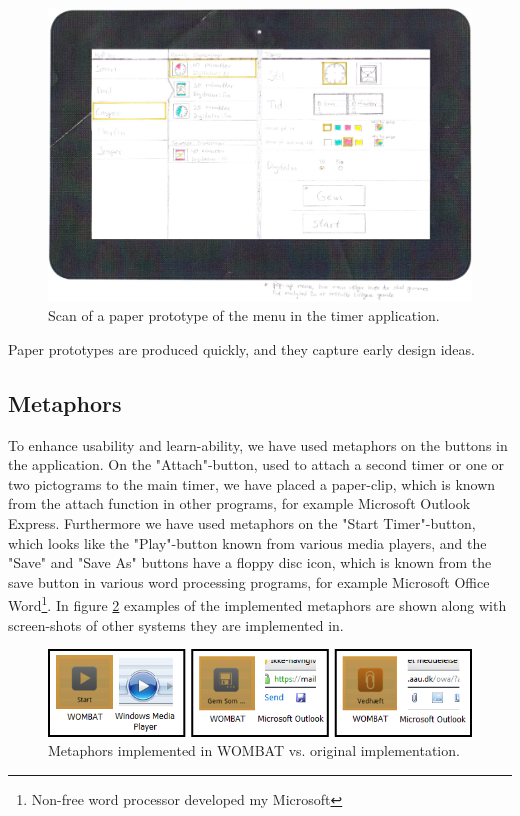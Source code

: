 	\begin{figure}[H]
		\centering
			\includegraphics[width=\textwidth]{Images/paper_prototype/menu.png}
				\caption{Scan of a paper prototype of the menu in the timer application.}
		\label{fig:pap_prot_menu}
	\end{figure}

Paper prototypes are produced quickly, and they capture early design ideas.

	\subsection{Metaphors}
	To enhance usability and learn-ability, we have used metaphors\cite{misc:designInterSys} on the buttons in the application. On the "Attach"-button, used to attach a second timer or one or two pictograms to the main timer, we have placed a paper-clip, which is known from the attach function in other programs, for example Microsoft Outlook Express. Furthermore we have used metaphors on the "Start Timer"-button, which looks like the "Play"-button known from various media players, and the "Save" and "Save As" buttons have a floppy disc icon, which is known from the save button in various word processing programs, for example Microsoft Office Word\footnote{Non-free word processor developed my Microsoft}. In figure \ref{fig:metaphors} examples of the implemented metaphors are shown along with screen-shots of other systems they are implemented in.

	\begin{figure}[H]
		\centering
			\includegraphics[width=\textwidth]{Images/Implementation/wombat_metaphors.png}
				\caption{Metaphors implemented in WOMBAT vs. original implementation.}
		\label{fig:metaphors}
	\end{figure}